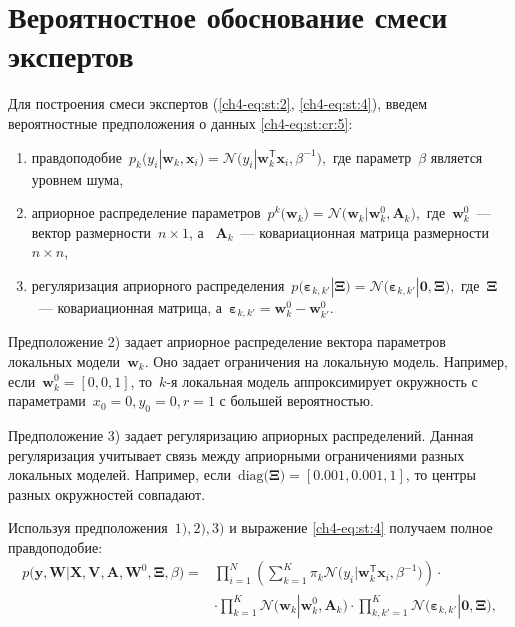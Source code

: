 \section{Вероятностное обоснование смеси экспертов}
Для построения смеси экспертов (\ref{ch4-eq:st:2},  \ref{ch4-eq:st:4}), введем вероятностные предположения о данных \eqref{ch4-eq:st:cr:5}:

\begin{enumerate}[1)]
	\item правдоподобие~$p_{k}\bigr(y_{i}|\mathbf{w}_{k}, \mathbf{x}_{i}\bigr) = \mathcal{N}\bigr(y_{i}|\mathbf{w}_{k}^{\mathsf{T}}\mathbf{x}_{i}, \beta^{-1}\bigr),$ где параметр~$\beta$ является уровнем шума,
	\item априорное распределение параметров~$p^{k}\bigr(\mathbf{w}_{k}\bigr) = \mathcal{N}\bigr(\mathbf{w}_{k}|\mathbf{w}^{0}_{k}, \mathbf{A}_{k}\bigr),$ где~$\mathbf{w}^{0}_{k}$~--- вектор размерности~$n\times1$, а ~$\mathbf{A}_{k}$~--- ковариационная матрица размерности~$n\times n$,
	\item регуляризация априорного распределения~$p\bigr(\bm{\varepsilon}_{k,k'}|\bm{\Xi}\bigr) = \mathcal{N}\bigr(\bm{\varepsilon}_{k,k'}|\mathbf{0},  \bm{\Xi}\bigr),$ где~$\bm{\Xi}$~--- ковариационная матрица, а~$\bm{\varepsilon}_{k,k'} = \mathbf{w}_{k}^{0}-\mathbf{w}_{k'}^{0}.$
\end{enumerate}
Предположение 2) задает априорное распределение вектора параметров локальных модели~$\textbf{w}_k$. Оно задает ограничения на локальную модель. Например, если~$\textbf{w}_k^{0} = [0,0,1]$, то~$k$-я локальная модель аппроксимирует окружность с параметрами~$x_0=0, y_0=0, r=1$ с большей вероятностью.

Предположение 3) задает регуляризацию априорных распределений. Данная регуляризация учитывает связь между априорными ограничениями разных локальных моделей. Например, если~$\text{diag}\bigr(\bm{\Xi}\bigr)=[0.001, 0.001, 1]$, то  центры разных окружностей совпадают.

Используя предположения~$1), 2), 3)$ и выражение \eqref{ch4-eq:st:4} получаем полное правдоподобие:
\[
\label{ch4-eq:em:1}
\begin{aligned}
p\bigr(\mathbf{y}, \mathbf{W}|\mathbf{X}, \mathbf{V}, \textbf{A}, \textbf{W}^{0}, \bm{\Xi}, \beta\bigr) = &\prod_{i=1}^{N}\left(\sum_{k=1}^{K}\pi_{k}\mathcal{N}\bigr(y_{i}|\mathbf{w}_{k}^{\mathsf{T}}\mathbf{x}_{i}, \beta^{-1}\bigr)\right)\cdot\\
&\cdot\prod_{k=1}^{K}\mathcal{N}\bigr(\mathbf{w}_{k}|\mathbf{w}^{0}_{k}, \mathbf{A}_{k}\bigr)\cdot\prod_{k,k'=1}^{K}\mathcal{N}\bigr(\bm{\varepsilon}_{k,k'}|\mathbf{0},  \bm{\Xi}\bigr),
\end{aligned}
\]

